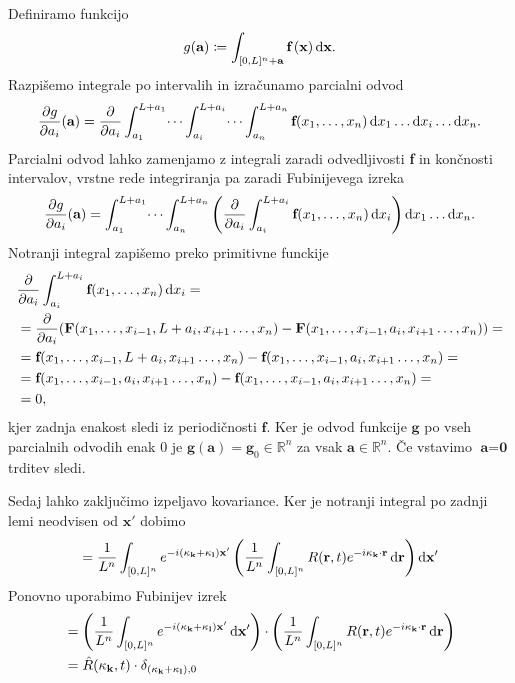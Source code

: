 \documentclass[mat2, tisk]{fmfdelo}
\newcommand{\R}{\mathbb R}
\newcommand{\bd}{\textbf}
\begin{document}
\begin{dokaz}
Definiramo funkcijo 
$$
g(\bd{a}) \coloneqq \int_{[0, L]^n + \bd{a}}\bd{f}\,(\bd{x}) \dif\bd{x}.
$$
Razpišemo integrale po intervalih in izračunamo parcialni odvod
\begin{align*}
\frac{\partial g}{\partial a_i}(\bd{a}) = \frac{\partial}{\partial a_i} \int_{a_1}^{L + a_1} \dots \int_{a_i}^{L + a_i} \dots \int_{a_n}^{L + a_n} \bd{f}(x_1, \dots, x_n) \dif x_1 \dots \dif x_i \dots  \dif x_n.
\end{align*}
Parcialni odvod lahko zamenjamo z integrali zaradi odvedljivosti \bd{f} in končnosti 
intervalov, vrstne rede integriranja pa zaradi Fubinijevega izreka 
\begin{align*}
  \frac{\partial g}{\partial a_i}(\bd{a}) = \int_{a_1}^{L + a_1} \dots \int_{a_n}^{L + a_n} \left(\frac{\partial}{\partial a_i} \int_{a_i}^{L + a_i} \bd{f}(x_1, \dots, x_n) \dif x_i \right) \dif x_1 \dots \dif x_n.
\end{align*}
Notranji integral zapišemo preko primitivne funckije 
\begin{align*}
&\frac{\partial}{\partial a_i} \int_{a_i}^{L + a_i} \bd{f}(x_1, \dots, x_n) \dif x_i = \\
&= \frac{\partial}{\partial a_i} (\bd{F}(x_1, \dots, x_{i-1}, L + a_i, x_{i+1} \dots, x_n) - \bd{F}(x_1, \dots, x_{i-1},  a_i, x_{i+1} \dots, x_n)) = \\
&= \bd{f}(x_1, \dots, x_{i-1}, L + a_i, x_{i+1} \dots, x_n) - \bd{f}(x_1, \dots, x_{i-1},  a_i, x_{i+1} \dots, x_n) = \\
&= \bd{f}(x_1, \dots, x_{i-1}, a_i, x_{i+1} \dots, x_n) - \bd{f}(x_1, \dots, x_{i-1},  a_i, x_{i+1} \dots, x_n) = \\
&= 0,
\end{align*}
kjer zadnja enakost sledi iz periodičnosti $\bd{f}$. Ker je odvod funkcije 
$\bd{g}$ po vseh parcialnih odvodih enak $0$ je $\bd{g}(\bd{a}) = \bd{g}_0 \in \R^n$  
za vsak $\bd{a} \in \R^n$. Če vstavimo $\bd{a} = \bd{0}$ trditev sledi.
\end{dokaz}
Sedaj lahko zaključimo izpeljavo kovariance. Ker je notranji integral po zadnji lemi neodvisen 
od $\bd{x}'$ dobimo 
$$
= \frac{1}{L^{n}} \int_{[0, L]^{n}} e^{-i(\bd{\text{$\kappa$}}_{\bd{k}} + \bd{\text{$\kappa$}}_{\bd{l}})\bd{x}'}\left(\frac{1}{L^n}\int_{[0, L]^{n}} R(\bd{r}, t) e^{-i\bd{\text{$\kappa$}}_{\bd{k}} \cdot \bd{r}} \dif\bd{r}\right) \dif\bd{x}'
$$
Ponovno uporabimo Fubinijev izrek 
\begin{align*}
&= \left(\frac{1}{L^{n}} \int_{[0, L]^{n}} e^{-i(\bd{\text{$\kappa$}}_{\bd{k}} + \bd{\text{$\kappa$}}_{\bd{l}})\bd{x}'} \dif\bd{x}' \right) \cdot\left(\frac{1}{L^n}\int_{[0, L]^{n}} R(\bd{r}, t) e^{-i\bd{\text{$\kappa$}}_{\bd{k}} \cdot \bd{r}} \dif\bd{r}\right) \\
&= \hat{R}(\text{\bd{$\kappa$}}_{\bd{k}}, t) \cdot \delta_{(\bd{\text{$\kappa$}}_{\bd{k}} + \bd{\text{$\kappa$}}_{\bd{l}}), 0}
\end{align*}
\end{document}
